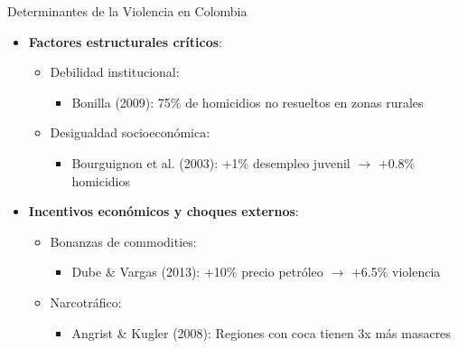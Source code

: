 \begin{frame}{Determinantes de la Violencia en Colombia}
    \begin{itemize}
        \item \textbf{Factores estructurales críticos}:
        \begin{itemize}
            \item \alert{Debilidad institucional}: 
            \begin{itemize}
                \item Bonilla (2009): 75\% de homicidios no resueltos en zonas rurales 
            \end{itemize}
            
            \item \alert{Desigualdad socioeconómica}:
            \begin{itemize}
                \item Bourguignon et al. (2003): +1\% desempleo juvenil $\rightarrow$ +0.8\% homicidios
            \end{itemize}
        \end{itemize}
        
        \vspace{0.4cm}
        
        \item \textbf{Incentivos económicos y choques externos}:
        \begin{itemize}
            \item \alert{Bonanzas de commodities}:
            \begin{itemize}
                \item Dube \& Vargas (2013): +10\% precio petróleo $\rightarrow$ +6.5\% violencia
            \end{itemize}
            
            \item \alert{Narcotráfico}:
            \begin{itemize}
                \item Angrist \& Kugler (2008): Regiones con coca tienen 3x más masacres
            \end{itemize}
        \end{itemize}
    \end{itemize}

\end{frame}